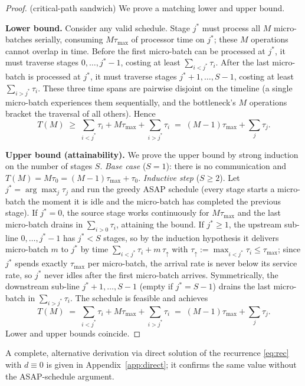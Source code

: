 \documentclass[11pt]{article}
\begin{document}
\begin{proof}(critical-path sandwich)
We prove a matching lower and upper bound.

\textbf{Lower bound.} Consider any valid schedule. Stage $j^*$ must process all $M$ micro-batches serially, consuming $M\tau_{\max}$ of processor time on $j^*$; these $M$ operations cannot overlap in time. Before the first micro-batch can be processed at $j^*$, it must traverse stages $0,\dots,j^*-1$, costing at least $\sum_{i<j^*}\tau_i$. After the last micro-batch is processed at $j^*$, it must traverse stages $j^*+1,\dots,S-1$, costing at least $\sum_{i>j^*}\tau_i$. These three time spans are pairwise disjoint on the timeline (a single micro-batch experiences them sequentially, and the bottleneck's $M$ operations bracket the traversal of all others). Hence
\[
T(M) \;\ge\; \sum_{i<j^*}\tau_i + M\tau_{\max} + \sum_{i>j^*}\tau_i
\;=\; (M-1)\tau_{\max} + \sum_j\tau_j .
\]

\textbf{Upper bound (attainability).} We prove the upper bound by strong induction on the number of stages $S$. \emph{Base case} ($S=1$): there is no communication and $T(M)=M\tau_0=(M-1)\tau_{\max}+\tau_0$. \emph{Inductive step} ($S\ge2$). Let $j^*=\arg\max_j\tau_j$ and run the greedy ASAP schedule (every stage starts a micro-batch the moment it is idle and the micro-batch has completed the previous stage). If $j^*=0$, the source stage works continuously for $M\tau_{\max}$ and the last micro-batch drains in $\sum_{i>0}\tau_i$, attaining the bound. If $j^*\ge1$, the upstream sub-line $0,\dots,j^*-1$ has $j^*<S$ stages, so by the induction hypothesis it delivers micro-batch $m$ to $j^*$ by time $\sum_{i<j^*}\tau_i+m\,\tau_{\uparrow}$ with $\tau_{\uparrow}:=\max_{i<j^*}\tau_i\le\tau_{\max}$; since $j^*$ spends exactly $\tau_{\max}$ per micro-batch, the arrival rate is never below its service rate, so $j^*$ never idles after the first micro-batch arrives. Symmetrically, the downstream sub-line $j^*+1,\dots,S-1$ (empty if $j^*=S-1$) drains the last micro-batch in $\sum_{i>j^*}\tau_i$. The schedule is feasible and achieves
\[
T(M) \;=\; \sum_{i<j^*}\tau_i + M\tau_{\max} + \sum_{i>j^*}\tau_i \;=\; (M-1)\tau_{\max} + \sum_j\tau_j .
\]
Lower and upper bounds coincide.
\end{proof}

A complete, alternative derivation via direct solution of the recurrence \eqref{eq:rec} with $d\equiv0$ is given in Appendix~\ref{app:direct}; it confirms the same value without the ASAP-schedule argument.
\end{document}
